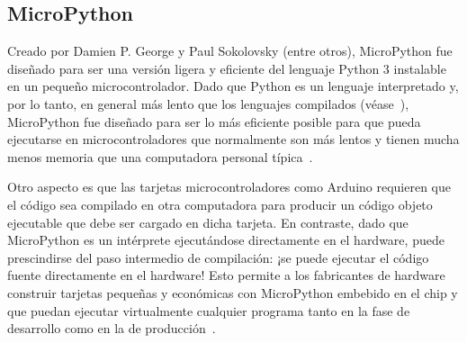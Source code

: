 %
%


\subsection{MicroPython}%
\label{sec:uPy}



Creado por Damien P. George y Paul Sokolovsky (entre otros),
MicroPython fue diseñado para ser una versión ligera y eficiente del lenguaje Python 3 instalable en un pequeño microcontrolador.
Dado que Python es un lenguaje interpretado y, por lo tanto, en general más lento que los lenguajes compilados (véase~), MicroPython fue diseñado para ser lo más eficiente posible para que pueda ejecutarse en microcontroladores que normalmente son más lentos y tienen mucha menos memoria que una computadora personal típica~.

Otro aspecto es que las tarjetas microcontroladores como Arduino requieren que el código sea compilado en otra computadora para producir un código objeto ejecutable que debe ser cargado en dicha tarjeta.
En contraste, dado que MicroPython es un intérprete ejecutándose directamente en el hardware, puede prescindirse del paso intermedio de compilación:
¡se puede ejecutar el código fuente directamente en el hardware!
Esto permite a los fabricantes de hardware construir tarjetas pequeñas y económicas con MicroPython embebido en el chip y que puedan ejecutar virtualmente cualquier programa tanto en la fase de desarrollo como en la de producción~.

